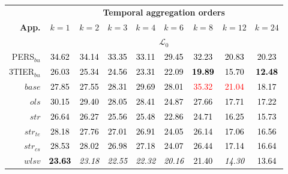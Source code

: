 
\begin{tabular}[t]{r|cccccccc}
\toprule
\multicolumn{1}{c}{\textbf{}} & \multicolumn{8}{c}{\textbf{Temporal aggregation orders}} \\
\textbf{App.} & $k=1$ & $k=2$ & $k=3$ & $k=4$ & $k=6$ & $k=8$ & $k=12$ & $k=24$\\
\midrule
\addlinespace[0.3em]
\multicolumn{1}{c}{} & \multicolumn{8}{c}{$\mathcal{L}_0$}\\
PERS$_{bu}$ & \textcolor{black}{34.62} & \textcolor{black}{34.14} & \textcolor{black}{33.35} & \textcolor{black}{33.11} & \textcolor{black}{29.45} & \textcolor{black}{32.23} & \textcolor{black}{20.83} & \textcolor{black}{20.23}\\
3TIER$_{bu}$ & \textcolor{black}{26.03} & \textcolor{black}{25.34} & \textcolor{black}{24.56} & \textcolor{black}{23.31} & \textcolor{black}{22.09} & \textcolor{black}{\textbf{19.89}} & \textcolor{black}{15.70} & \textcolor{black}{\textbf{12.48}}\\
$base$ & \textcolor{black}{27.85} & \textcolor{black}{27.55} & \textcolor{black}{28.31} & \textcolor{black}{29.69} & \textcolor{black}{28.01} & \textcolor{red}{35.32} & \textcolor{red}{21.04} & \textcolor{black}{18.17}\\
$ols$ & \textcolor{black}{30.15} & \textcolor{black}{29.40} & \textcolor{black}{28.05} & \textcolor{black}{28.41} & \textcolor{black}{24.87} & \textcolor{black}{27.66} & \textcolor{black}{17.71} & \textcolor{black}{17.22}\\
$str$ & \textcolor{black}{26.64} & \textcolor{black}{26.27} & \textcolor{black}{25.56} & \textcolor{black}{25.48} & \textcolor{black}{22.86} & \textcolor{black}{24.71} & \textcolor{black}{16.25} & \textcolor{black}{15.73}\\
$str_{te}$ & \textcolor{black}{28.18} & \textcolor{black}{27.76} & \textcolor{black}{27.01} & \textcolor{black}{26.91} & \textcolor{black}{24.05} & \textcolor{black}{26.14} & \textcolor{black}{17.06} & \textcolor{black}{16.56}\\
$str_{cs}$ & \textcolor{black}{28.53} & \textcolor{black}{28.02} & \textcolor{black}{26.98} & \textcolor{black}{27.18} & \textcolor{black}{24.07} & \textcolor{black}{26.44} & \textcolor{black}{17.14} & \textcolor{black}{16.64}\\
$wlsv$ & \textcolor{black}{\textbf{23.63}} & \textcolor{black}{\em{23.18}} & \textcolor{black}{\em{22.55}} & \textcolor{black}{\em{22.32}} & \textcolor{black}{\em{20.16}} & \textcolor{black}{21.40} & \textcolor{black}{\em{14.30}} & \textcolor{black}{13.64}\\

\end{tabular}
